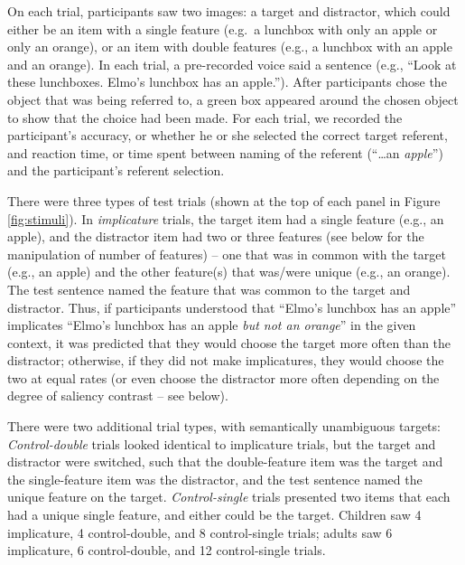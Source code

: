 \documentclass[man]{apa6}
\theoremstyle{definition}
\theoremstyle{definition}
\theoremstyle{definition}
\theoremstyle{remark}
\begin{document}
On each trial, participants saw two images: a target and distractor,
which could either be an item with a single feature (e.g.~a lunchbox
with only an apple or only an orange), or an item with double features
(e.g., a lunchbox with an apple and an orange). In each trial, a
pre-recorded voice said a sentence (e.g., \enquote{Look at these
lunchboxes. Elmo's lunchbox has an apple.}). After participants chose
the object that was being referred to, a green box appeared around the
chosen object to show that the choice had been made. For each trial, we
recorded the participant's accuracy, or whether he or she selected the
correct target referent, and reaction time, or time spent between naming
of the referent (\enquote{\ldots{}an \emph{apple}}) and the
participant's referent selection.

There were three types of test trials (shown at the top of each panel in
Figure \ref{fig:stimuli}). In \emph{implicature} trials, the target item
had a single feature (e.g., an apple), and the distractor item had two
or three features (see below for the manipulation of number of features)
-- one that was in common with the target (e.g., an apple) and the other
feature(s) that was/were unique (e.g., an orange). The test sentence
named the feature that was common to the target and distractor. Thus, if
participants understood that \enquote{Elmo's lunchbox has an apple}
implicates \enquote{Elmo's lunchbox has an apple \emph{but not an
orange}} in the given context, it was predicted that they would choose
the target more often than the distractor; otherwise, if they did not
make implicatures, they would choose the two at equal rates (or even
choose the distractor more often depending on the degree of saliency
contrast -- see below).

There were two additional trial types, with semantically unambiguous
targets: \emph{Control-double} trials looked identical to implicature
trials, but the target and distractor were switched, such that the
double-feature item was the target and the single-feature item was the
distractor, and the test sentence named the unique feature on the
target. \emph{Control-single} trials presented two items that each had a
unique single feature, and either could be the target. Children saw 4
implicature, 4 control-double, and 8 control-single trials; adults saw 6
implicature, 6 control-double, and 12 control-single trials.
\end{document}
